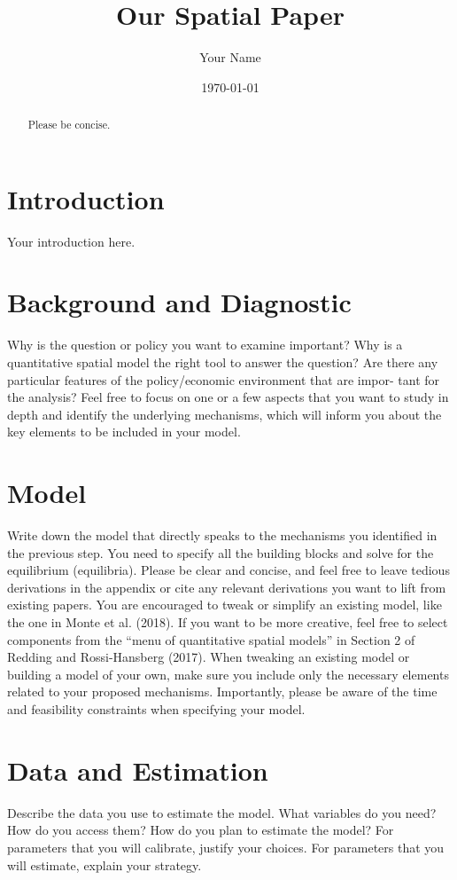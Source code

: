 \documentclass{article}
\title{Our Spatial Paper}
\author{Your Name}
\date{\today}
\begin{document}
\maketitle

\begin{abstract}
    Please be concise.
\end{abstract}

\section{Introduction}
\label{sec:intro}
Your introduction here.

\section{Background and Diagnostic}
Why is the question or policy you want to examine
important? Why is a quantitative spatial model the right tool to answer the question?
Are there any particular features of the policy/economic environment that are impor-
tant for the analysis? Feel free to focus on one or a few aspects that you want to study
in depth and identify the underlying mechanisms, which will inform you about the key
elements to be included in your model.
\section{Model}

Write down the model that directly speaks to the mechanisms you identified
in the previous step. You need to specify all the building blocks and solve for the
equilibrium (equilibria). Please be clear and concise, and feel free to leave tedious
derivations in the appendix or cite any relevant derivations you want to lift from
existing papers.
You are encouraged to tweak or simplify an existing model, like the one in Monte et
al. (2018). If you want to be more creative, feel free to select components from the
“menu of quantitative spatial models” in Section 2 of Redding and Rossi-Hansberg
(2017). When tweaking an existing model or building a model of your own, make
sure you include only the necessary elements related to your proposed mechanisms.
Importantly, please be aware of the time and feasibility constraints when specifying
your model.

\section{Data and Estimation}
\label{sec:data}
Describe the data you use to estimate the model. What
variables do you need? How do you access them? How do you plan to estimate the
model? For parameters that you will calibrate, justify your choices. For parameters
that you will estimate, explain your strategy.
\end{document}
